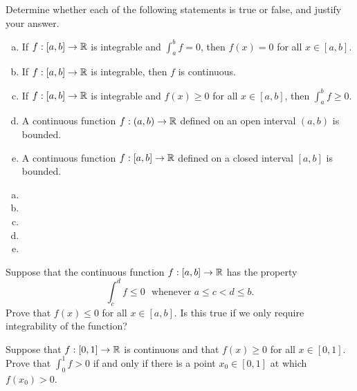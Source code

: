\documentclass[letterpaper, twoside, 12pt]{book}
\begin{document}
\begin{exercise}[1]
  Determine whether each of the following statements is true or false, and
  justify your answer.
  \begin{enumerate}[(a)]
    \item If \(f:[a,b]\to\mathbb R\) is integrable and \(\int_a^b f=0\), then
      \(f(x)=0\) for all \(x\in[a,b]\).
    \item If \(f:[a,b]\to\mathbb R\) is integrable, then \(f\) is continuous.
    \item If \(f:[a,b]\to\mathbb R\) is integrable and \(f(x)\geq0\) for all
      \(x\in[a,b]\), then \(\int_a^b f\geq 0\).
    \item A continuous function \(f:(a,b)\to\mathbb R\) defined on an open interval
      \((a,b)\) is bounded.
    \item A continuous function \(f:[a,b]\to\mathbb R\) defined on a closed interval
      \([a,b]\) is bounded.
  \end{enumerate}
\end{exercise}
\begin{solution}
  \begin{enumerate}[(a)]
    \item
    \item
    \item
    \item
    \item
  \end{enumerate}
\end{solution}


\begin{exercise}[5]
  Suppose that the continuous function \(f:[a,b]\to\mathbb R\) has the property
  \[
    \int_c^d f\leq 0
      \text{~~whenever~}
    a\leq c<d\leq b
  .\]
  Prove that \(f(x)\leq 0\) for all \(x\in[a,b]\). Is this true if we only
  require integrability of the function?
\end{exercise}
\begin{solution}

\end{solution}


\begin{exercise}[6]
  Suppose that \(f:[0,1]\to\mathbb R\) is continuous and that \(f(x)\geq 0\) for
  all \(x\in[0,1]\). Prove that \(\int_0^1 f>0\) if and only if there is a
  point \(x_0\in[0,1]\) at which \(f(x_0)>0\).
\end{exercise}
\begin{solution}

\end{solution}
\end{document}
